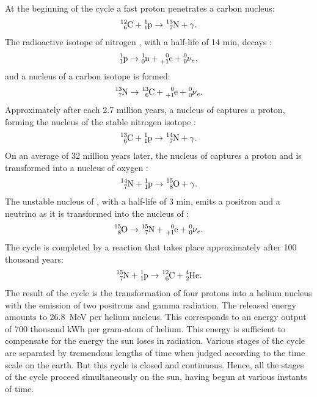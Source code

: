At the beginning of the cycle a fast proton penetrates a carbon nucleus:
\begin{equation*}%
\ce{^{12}_{6}C} + \ce{^{1}_{1}p}  \to \ce{^{13}_{7}N} +  \gamma. 
\end{equation*}
The radioactive isotope of nitrogen , with a half-life of 14 min, decays : 
\begin{equation*}%
\ce{^{1}_{1}p} \to \ce{^{1}_{0}n} + \ce{^{0}_{+1}e} +\ce{^{0}_{0}\nu_{e}},
\end{equation*}
and a nucleus of a carbon isotope is formed:
\begin{equation*}%
\ce{^{13}_{7}N} \to \ce{^{13}_{6}C} + \ce{^{0}_{+1}e} +\ce{^{0}_{0}\nu_{e}}.
\end{equation*}
Approximately after each 2.7 million years, a nucleus of   captures a proton, forming the nucleus of the stable nitrogen isotope :
\begin{equation*}%
\ce{^{13}_{6}C} + \ce{^{1}_{1}p}  \to \ce{^{14}_{7}N} + \gamma. 
\end{equation*}
On an average of 32 million years later, the nucleus of captures a proton and is transformed into a nucleus of oxygen :
\begin{equation*}%
\ce{^{14}_{7}N} + \ce{^{1}_{1}p}  \to \ce{^{15}_{8}O} +  \gamma. 
\end{equation*}
The unstable nucleus of , with a half-life of 3 min, emits a positron and a neutrino as it is transformed into the nucleus of :
\begin{equation*}%
\ce{^{15}_{8}O} \to \ce{^{15}_{7}N} +\ce{^{0}_{+1}e} +\ce{^{0}_{0}\nu_{e}}. 
\end{equation*}
The cycle is completed by a reaction that takes place approximately after 100 thousand years:
\begin{equation*}%
\ce{^{15}_{7}N}  + \ce{^{1}_{1}p}  \to \ce{^{12}_{6}C} +  \ce{^{4}_{2}He}. 
\end{equation*}
The result of the cycle is the transformation of four protons into a helium nucleus with the emission of two positrons and gamma radiation. The released energy amounts to \SI{26.8}{\MeV} per helium nucleus. This corresponds to an energy output of 700 thousand kWh per gram-atom of helium. This energy is sufficient to compensate for the energy the sun loses in radiation. Various stages of the cycle are separated by tremendous lengths of time when judged according to the time scale on the earth. But this cycle is closed and continuous. Hence, all the stages of the cycle proceed simultaneously on the sun, having begun at various instants of time.
